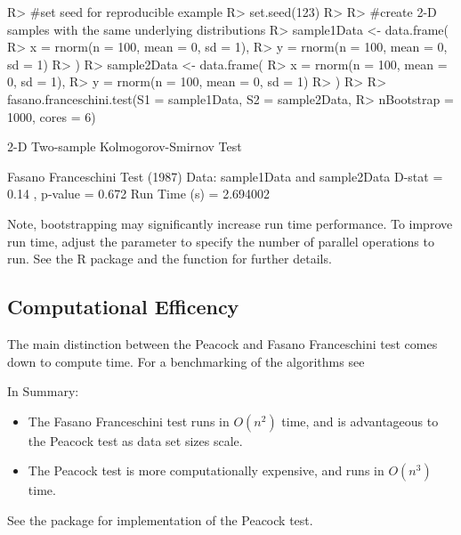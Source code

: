 \documentclass[codesnippet]{jss}
\newcommand{\fct}[1]{\code{#1()}}
\begin{document}
\begin{CodeChunk}
\begin{CodeInput}
R> #set seed for reproducible example
R> set.seed(123)
R>
R> #create 2-D samples with the same underlying distributions
R> sample1Data <- data.frame(
R>  x = rnorm(n = 100, mean = 0, sd = 1),
R>  y = rnorm(n = 100, mean = 0, sd = 1)
R> )
R> sample2Data <- data.frame(
R>  x = rnorm(n = 100, mean = 0, sd = 1),
R>  y = rnorm(n = 100, mean = 0, sd = 1)
R> )
R>
R> fasano.franceschini.test(S1 = sample1Data, S2 = sample2Data,
R>                          nBootstrap = 1000, cores = 6)
\end{CodeInput}
\begin{CodeOutput}
      2-D Two-sample Kolmogorov-Smirnov Test

 Fasano Franceschini Test (1987)
 Data:  sample1Data and sample2Data
 D-stat =  0.14 , p-value =  0.672
 Run Time (s) =  2.694002
\end{CodeOutput}
\end{CodeChunk}

Note, bootstrapping may significantly increase run time performance. To improve run time, adjust the  parameter to specify the number of parallel operations to run. See the R  package and the \fct{mclapply} function for further details.

\subsection{Computational Efficency}
The main distinction between the Peacock and Fasano Franceschini test comes down to compute time. For a benchmarking of the algorithms see \citep{Lopes2007}

In Summary:
\begin{itemize}
\item The Fasano Franceschini test runs in $O(n^2)$ time, and is advantageous to the Peacock test as data set sizes scale.
\item The Peacock test is more computationally expensive, and runs in $O(n^3)$ time.
\end{itemize}

See the  package for  implementation of the Peacock test.
\end{document}
